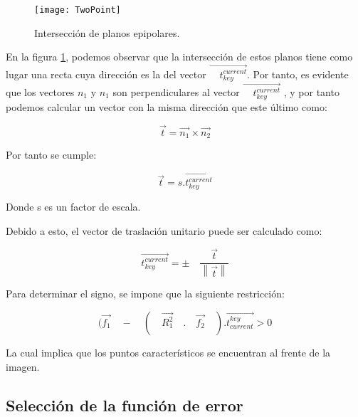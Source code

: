 \begin{figure}[H]
	\centering
	\texttt{[image: TwoPoint]}
	\caption[Intersección de planos epipolares]{Intersección de planos epipolares.}
	\label{imagen:epipolarPlanes}
\end{figure}


En la figura \ref{imagen:epipolarPlanes}, podemos observar que la intersección de estos planos tiene como lugar una recta cuya dirección es la del vector  $\overset { \rightarrow  }{ { \quad t }_{ key }^{ current } } $. Por tanto, es evidente que los vectores ${n}_{1}$ y ${n}_{1}$ son perpendiculares al vector $\overset { \rightarrow  }{ { \quad t }_{ key }^{ current } }  $ , y por tanto podemos calcular un vector con la misma dirección que este último como:


\begin{equation}
\overset { \rightarrow  }{ { t } } =\overset { \rightarrow  }{ { { n }_{ 1 } } } \times \overset { \rightarrow  }{ { { n }_{ 2 } } } 
\end{equation}

Por tanto se cumple:

\begin{equation}
 \overset { \rightarrow  }{ { t } } = s.\overset { \rightarrow  }{ {t }_{ key }^{ current } } 
\end{equation}

Donde s es un factor de escala.

Debido a esto, el vector de traslación unitario puede ser calculado como:

\begin{equation}
\overset { \rightarrow  }{ { t }_{ key}^{ current } } =\pm \quad \frac { \overset { \rightarrow  }{ t }  }{ \left\| \overset { \rightarrow  }{ t }  \right\|  } 
\end{equation}

Para determinar el signo, se  impone que la siguiente restricción:

\begin{equation}
(\overset { \rightarrow  }{ { f }_{ 1 } } \quad -\quad (\quad \overset { \rightarrow  }{ { { R }_{ 1 }^{ 2 } } } \quad .\quad \overset { \rightarrow  }{ { f }_{ 2 } } \quad ).\overset { \rightarrow  }{ { t }_{ current }^{ key } } >0
\end{equation}

La cual implica que los puntos característicos se encuentran al frente de la imagen.



\subsection{Selección de la función de error }

